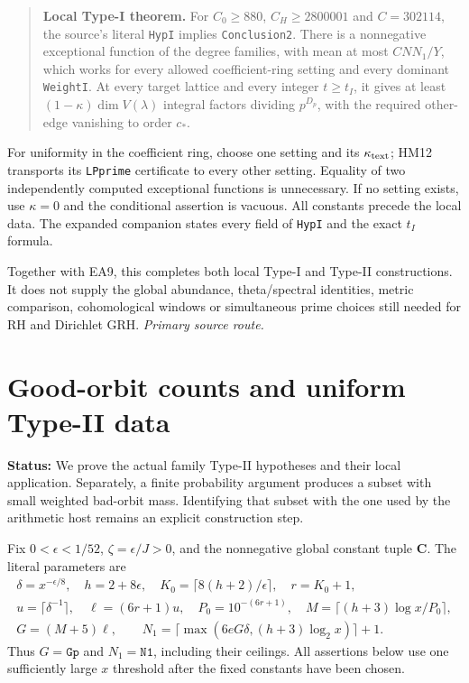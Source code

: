 \documentclass[11pt,a4paper]{article}
\numberwithin{equation}{section}
\theoremstyle{remark}\newtheorem{remark}[theorem]{Remark}
\newcommand{\status}[1]{\textbf{Status:} #1}
\begin{document}
\begin{quote}
\textbf{Local Type-I theorem.}
For $C_0\ge880$, $C_H\ge2800001$ and $C=302114$,
the source's literal \texttt{HypI} implies
\texttt{Conclusion2}.
There is a nonnegative exceptional function of the degree
families, with mean at most $CNN_1/Y$, which works for every
allowed coefficient-ring setting and every dominant
\texttt{WeightI}. At every target lattice and every integer
$t\ge t_I$, it gives at least
$(1-\kappa)\dim V(\lambda)$ integral factors dividing $p^{D_p}$,
with the required other-edge vanishing to order $c_*$.
\end{quote}

For uniformity in the coefficient ring, choose one setting and
its $\kappa_{\rm text}$; HM12 transports its \texttt{LPprime}
certificate to every other setting. Equality of two independently
computed exceptional functions is unnecessary. If no setting
exists, use $\kappa=0$ and the conditional assertion is vacuous.
All constants precede the local data. The expanded companion
states every field of \texttt{HypI} and the exact $t_I$ formula.

Together with EA9, this completes both local Type-I and Type-II
constructions. It does not supply the global abundance,
theta/spectral identities, metric comparison, cohomological
windows or simultaneous prime choices still needed for RH
and Dirichlet GRH.
\noindent\textit{Primary source route.}\cite{type-one-complete}


\section{Good-orbit counts and uniform Type-II data}
\label{sec:type-two-family}

\status{We prove the actual family Type-II hypotheses and their local
application. Separately, a finite probability argument produces a subset
with small weighted bad-orbit mass. Identifying that subset with the one
used by the arithmetic host remains an explicit construction step.}

Fix $0<\epsilon<1/52$, $\zeta=\epsilon/J>0$, and the nonnegative global
constant tuple $\mathbf C$. The literal parameters are
\[
\begin{gathered}
 \delta=x^{-\epsilon/8},\quad h=2+8\epsilon,\quad
 K_0=\lceil8(h+2)/\epsilon\rceil,\quad r=K_0+1,\\
 u=\lceil\delta^{-1}\rceil,\quad \ell=(6r+1)u,\quad
 P_0=10^{-(6r+1)},\quad M=\lceil(h+3)\log x/P_0\rceil,\\
 G=(M+5)\ell,\qquad
 N_1=\lceil\max(6eG\delta,(h+3)\log_2x)\rceil+1.
\end{gathered}\tag{GII.1}
\]
Thus $G=\texttt{Gp}$ and $N_1=\texttt{N1}$, including their ceilings.
All assertions below use one sufficiently large $x$ threshold after the
fixed constants have been chosen.
\end{document}
